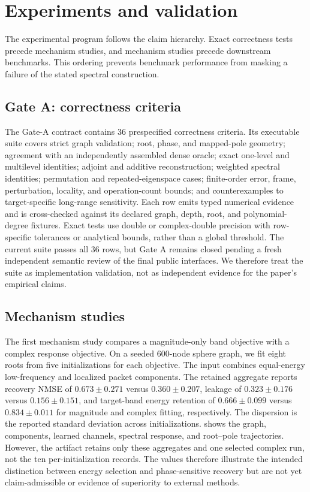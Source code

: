 \section{Experiments and validation}
\label{sec:experiments}

The experimental program follows the claim hierarchy. Exact correctness tests precede mechanism studies, and mechanism studies precede downstream benchmarks. This ordering prevents benchmark performance from masking a failure of the stated spectral construction.

\subsection{Gate A: correctness criteria}

The Gate-A contract contains 36 prespecified correctness criteria.  Its
executable suite covers strict graph validation; root, phase, and mapped-pole
geometry; agreement with an independently assembled dense oracle; exact
one-level and multilevel identities; adjoint and additive reconstruction;
weighted spectral identities; permutation and repeated-eigenspace cases;
finite-order error, frame, perturbation, locality, and operation-count bounds;
and counterexamples to target-specific long-range sensitivity.  Each row emits
typed numerical evidence and is cross-checked against its declared graph,
depth, root, and polynomial-degree fixtures.  Exact tests use double or
complex-double precision with row-specific tolerances or analytical bounds,
rather than a global threshold.  The current suite passes all 36 rows, but
Gate A remains closed pending a fresh independent semantic review of the final
public interfaces.  We therefore treat the suite as implementation validation,
not as independent evidence for the paper's empirical claims.

\subsection{Mechanism studies}

The first mechanism study compares a magnitude-only band objective with a complex response objective. On a seeded 600-node sphere graph, we fit eight roots from five initializations for each objective. The input combines equal-energy low-frequency and localized packet components. The retained aggregate reports recovery NMSE of $0.673\pm0.271$ versus $0.360\pm0.207$, leakage of $0.323\pm0.176$ versus $0.156\pm0.151$, and target-band energy retention of $0.666\pm0.099$ versus $0.834\pm0.011$ for magnitude and complex fitting, respectively. The dispersion is the reported standard deviation across initializations.  shows the graph, components, learned channels, spectral response, and root--pole trajectories. However, the artifact retains only these aggregates and one selected complex run, not the ten per-initialization records. The values therefore illustrate the intended distinction between energy selection and phase-sensitive recovery but are not yet claim-admissible or evidence of superiority to external methods.

